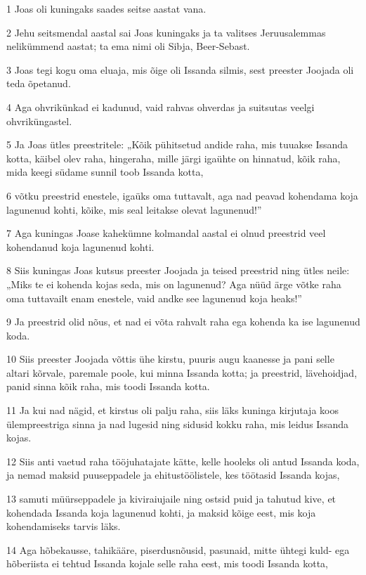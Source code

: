 \par 1 Joas oli kuningaks saades seitse aastat vana.
\par 2 Jehu seitsmendal aastal sai Joas kuningaks ja ta valitses Jeruusalemmas nelikümmend aastat; ta ema nimi oli Sibja, Beer-Sebast.
\par 3 Joas tegi kogu oma eluaja, mis õige oli Issanda silmis, sest preester Joojada oli teda õpetanud.
\par 4 Aga ohvrikünkad ei kadunud, vaid rahvas ohverdas ja suitsutas veelgi ohvriküngastel.
\par 5 Ja Joas ütles preestritele: „Kõik pühitsetud andide raha, mis tuuakse Issanda kotta, käibel olev raha, hingeraha, mille järgi igaühte on hinnatud, kõik raha, mida keegi südame sunnil toob Issanda kotta,
\par 6 võtku preestrid enestele, igaüks oma tuttavalt, aga nad peavad kohendama koja lagunenud kohti, kõike, mis seal leitakse olevat lagunenud!”
\par 7 Aga kuningas Joase kahekümne kolmandal aastal ei olnud preestrid veel kohendanud koja lagunenud kohti.
\par 8 Siis kuningas Joas kutsus preester Joojada ja teised preestrid ning ütles neile: „Miks te ei kohenda kojas seda, mis on lagunenud? Aga nüüd ärge võtke raha oma tuttavailt enam enestele, vaid andke see lagunenud koja heaks!”
\par 9 Ja preestrid olid nõus, et nad ei võta rahvalt raha ega kohenda ka ise lagunenud koda.
\par 10 Siis preester Joojada võttis ühe kirstu, puuris augu kaanesse ja pani selle altari kõrvale, paremale poole, kui minna Issanda kotta; ja preestrid, lävehoidjad, panid sinna kõik raha, mis toodi Issanda kotta.
\par 11 Ja kui nad nägid, et kirstus oli palju raha, siis läks kuninga kirjutaja koos ülempreestriga sinna ja nad lugesid ning sidusid kokku raha, mis leidus Issanda kojas.
\par 12 Siis anti vaetud raha tööjuhatajate kätte, kelle hooleks oli antud Issanda koda, ja nemad maksid puuseppadele ja ehitustöölistele, kes töötasid Issanda kojas,
\par 13 samuti müürseppadele ja kiviraiujaile ning ostsid puid ja tahutud kive, et kohendada Issanda koja lagunenud kohti, ja maksid kõige eest, mis koja kohendamiseks tarvis läks.
\par 14 Aga hõbekausse, tahikääre, piserdusnõusid, pasunaid, mitte ühtegi kuld- ega hõberiista ei tehtud Issanda kojale selle raha eest, mis toodi Issanda kotta,
